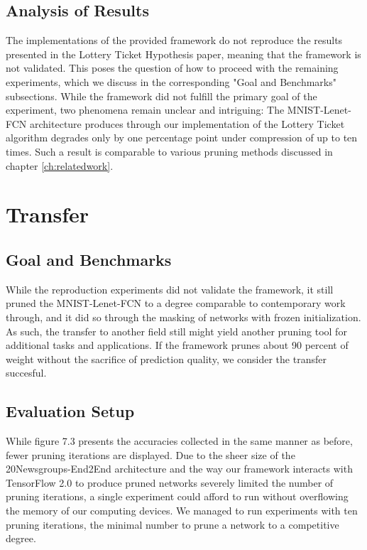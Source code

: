\subsection*{Analysis of Results}
The implementations of the provided framework do not reproduce the results presented in the Lottery Ticket Hypothesis paper, meaning that the framework is not validated. This poses the question of how to proceed with the remaining experiments, which we discuss in the corresponding "Goal and Benchmarks" subsections.
While the framework did not fulfill the primary goal of the experiment, two phenomena remain unclear and intriguing:
The MNIST-Lenet-FCN architecture produces through our implementation of the Lottery Ticket algorithm degrades only by one percentage point under compression of up to ten times. Such a result is comparable to various pruning methods discussed in chapter \ref{ch:relatedwork}. 


\section{Transfer}
\subsection*{Goal and Benchmarks}
While the reproduction experiments did not validate the framework, it still pruned the MNIST-Lenet-FCN to a degree comparable to contemporary work through, and it did so through the masking of networks with frozen initialization. As such, the transfer to another field still might yield another pruning tool for additional tasks and applications. If the framework prunes about 90 percent of weight without the sacrifice of prediction quality, we consider the transfer succesful.
\subsection*{Evaluation Setup}
While figure 7.3 presents the accuracies collected in the same manner as before, fewer pruning iterations are displayed. Due to the sheer size of the 20Newsgroups-End2End architecture and the way our framework interacts with TensorFlow 2.0 to produce pruned networks severely limited the number of pruning iterations, a single experiment could afford to run without overflowing the memory of our computing devices. We managed to run experiments with ten pruning iterations, the minimal number to prune a network to a competitive degree.
